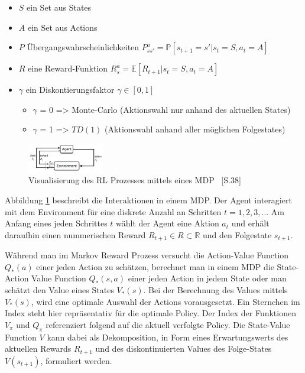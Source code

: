 \begin{itemize}
  \item $S$ ein Set aus States 
  \item $A$ ein Set aus Actions
  \item $P$ Übergangswahrscheinlichkeiten $P_{ss'}^a = \mathbb{P}[s_{t+1} = s' | s_t = S, a_t = A]$
  \item $R$ eine Reward-Funktion $R_s^a = \mathbb{E}[R_{t+1} | s_t = S, a_t = A]$
  \item $\gamma$ ein Diskontierungsfaktor $\gamma \in [0,1]$
  \begin{itemize}
     \item $\gamma$ = 0 => Monte-Carlo (Aktionswahl nur anhand des aktuellen States)
     \item $\gamma$ = 1 => $TD(1)$ (Aktionswahl anhand aller möglichen Folgestates)
  \end{itemize}
  \label{lst:itemList_mdp}
\end{itemize}

\begin{figure}[htb]
 \centering
 \includegraphics[width=0.3\textwidth,angle=0,scale=2.5]{abb/mdp_EnvLoop}
 \caption[Beschreibung]{Visualisierung des RL Prozesses mittels eines MDP \cite{sutton2011reinforcement}~[S.38]}
\label{fig:fig_mdpEnvLoop}
\end{figure}

Abbildung \ref{fig:fig_mdpEnvLoop} beschreibt die Interaktionen in einem MDP. Der Agent interagiert mit dem Environment für eine diskrete Anzahl an Schritten $t = 1, 2, 3, ..$. Am Anfang eines jeden Schrittes $t$ wählt der Agent eine Aktion $a_t$ und erhält daraufhin einen nummerischen Reward $R_{t+1} \in R \subset \mathbb{R}$ und den Folgestate $s_{t+1}$.

Während man im Markov Reward Prozess versucht die Action-Value Function $ Q_*(a) $ einer jeden Action zu schätzen, berechnet man in einem MDP die State-Action Value Function $ Q_*(s,a) $ einer jeden Action in jedem State oder man schätzt den Value eines States $ V_*(s) $. Bei der Berechnung des Values mittels $ V_*(s) $, wird eine optimale Auswahl der Actions vorausgesetzt. Ein Sternchen im Index steht hier repräsentativ für die optimale Policy. Der Index der Funktionen $ V_{\pi} $ und $Q_{\pi}$ referenziert folgend auf die aktuell verfolgte Policy. Die State-Value Function $V$ kann dabei als Dekomposition, in Form eines Erwartungswerts des aktuellen Rewards $ R_{t+1} $ und des diskontinuierten Values des Folge-States $ V(s_{t+1}) $, formuliert werden.



